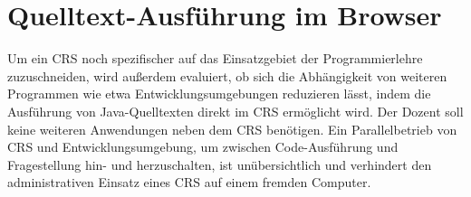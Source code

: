 \section{Quelltext-Ausführung im Browser}
\label{chap:codeausfuehrung}
Um ein CRS noch spezifischer auf das Einsatzgebiet der Programmierlehre zuzuschneiden, wird außerdem evaluiert, ob sich die Abhängigkeit von weiteren Programmen wie etwa Entwicklungsumgebungen reduzieren lässt, indem die Ausführung von Java-Quelltexten direkt im CRS ermöglicht wird. Der Dozent soll keine weiteren Anwendungen neben dem CRS benötigen. Ein Parallelbetrieb von CRS und Entwicklungsumgebung, um zwischen Code-Ausführung und Fragestellung hin- und herzuschalten, ist unübersichtlich und verhindert den administrativen Einsatz eines CRS auf einem fremden Computer.